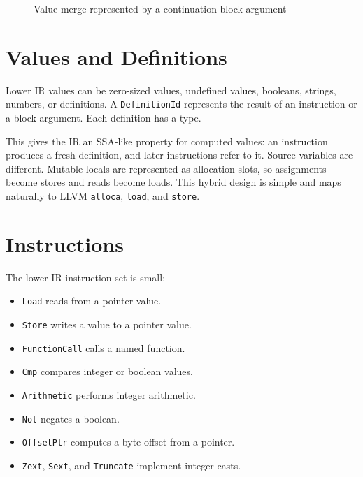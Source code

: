 \begin{figure}[H]
  \centering
  \caption{Value merge represented by a continuation block argument}
  \label{fig:block-args}
\end{figure}

\section{Values and Definitions}

Lower IR values can be zero-sized values, undefined values, booleans, strings,
numbers, or definitions. A \texttt{DefinitionId} represents the result of an
instruction or a block argument. Each definition has a type.

This gives the IR an SSA-like property for computed values: an instruction
produces a fresh definition, and later instructions refer to it. Source
variables are different. Mutable locals are represented as allocation slots, so
assignments become stores and reads become loads. This hybrid design is simple
and maps naturally to LLVM \texttt{alloca}, \texttt{load}, and \texttt{store}.

\section{Instructions}

The lower IR instruction set is small:

\begin{itemize}
  \item \texttt{Load} reads from a pointer value.
  \item \texttt{Store} writes a value to a pointer value.
  \item \texttt{FunctionCall} calls a named function.
  \item \texttt{Cmp} compares integer or boolean values.
  \item \texttt{Arithmetic} performs integer arithmetic.
  \item \texttt{Not} negates a boolean.
  \item \texttt{OffsetPtr} computes a byte offset from a pointer.
  \item \texttt{Zext}, \texttt{Sext}, and \texttt{Truncate} implement integer
        casts.
\end{itemize}

